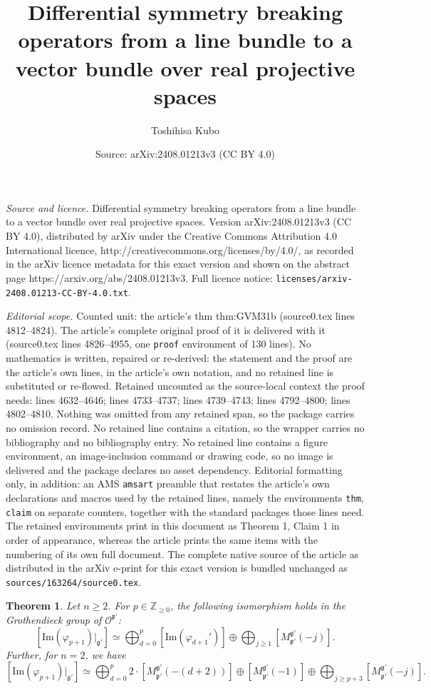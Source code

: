 \documentclass[10pt,a4paper]{amsart}
\title{Differential symmetry breaking operators from a line bundle to a vector bundle over real projective spaces}
\author{Toshihisa Kubo}
\date{Source: arXiv:2408.01213v3 (CC BY 4.0)}
\newtheorem{thm}{Theorem}
\newcommand{\Cal}{\mathcal}
\renewcommand{\Im}{\mathrm{Im}}
\newcommand{\Mpp}{M^{\fg'}_{\fp'}}
\newcommand{\Z}{\mathbb{Z}}
\newcommand{\fg}{{\mathfrak g}}
\newcommand{\fp}{{\mathfrak p}}
\begin{document}
\maketitle

\noindent\emph{Source and licence.} Differential symmetry breaking operators from a line bundle to a vector bundle over real projective spaces. Version arXiv:2408.01213v3 (CC BY 4.0), distributed by arXiv under the Creative Commons Attribution 4.0 International licence, http://creativecommons.org/licenses/by/4.0/, as recorded in the arXiv licence metadata for this exact version and shown on the abstract page https://arxiv.org/abs/2408.01213v3. Full licence notice: \texttt{licenses/arxiv-2408.01213-CC-BY-4.0.txt}.\par\smallskip

\noindent\textit{Editorial scope.} Counted unit: the article's thm thm:GVM31b (source0.tex lines 4812--4824). The article's complete original proof of it is delivered with it (source0.tex lines 4826--4955, one \texttt{proof} environment of 130 lines). No mathematics is written, repaired or re-derived: the statement and the proof are the article's own lines, in the article's own notation, and no retained line is substituted or re-flowed.  Retained uncounted as the source-local context the proof needs: lines 4632--4646; lines 4733--4737; lines 4739--4743; lines 4792--4800; lines 4802--4810.  Nothing was omitted from any retained span, so the package carries no omission record.  No retained line contains a citation, so the wrapper carries no bibliography and no bibliography entry.  No retained line contains a figure environment, an image-inclusion command or drawing code, so no image is delivered and the package declares no asset dependency.  Editorial formatting only, in addition: an AMS \texttt{amsart} preamble that restates the article's own declarations and macros used by the retained lines, namely the environments \texttt{thm}, \texttt{claim} on separate counters, together with the standard packages those lines need.  The retained environments print in this document as Theorem 1, Claim 1 in order of appearance, whereas the article prints the same items with the numbering of its own full document.  The complete native source of the article as distributed in the arXiv e-print for this exact version is bundled unchanged as \texttt{sources/163264/source0.tex}.
\begin{thm}\label{thm:GVM2}
Let $n\geq 2$. For $p \in \Z_{\geq 0}$, 
the following isomorphism holds
in the Grothendieck group of $\Cal{O}^{\fp'}$:
\begin{equation}\label{eqn:GVM3a}
[\Im(\varphi_{p+1})\vert_{\fg'}] \simeq 
\bigoplus_{d=0}^p [\Im (\varphi_{d+1}')] \oplus \bigoplus_{j \geq 1} [\Mpp(-j)].
\end{equation}
Further, for $n=2$, we have 
\begin{equation}\label{eqn:GVM3b}
[\Im(\varphi_{p+1})\vert_{\fg'}] \simeq 
\bigoplus_{d=0}^p 2 \cdot [\Mpp(-(d+2))] \oplus [\Mpp(-1)] \oplus 
\bigoplus_{j\geq p+3} [\Mpp(-j)].
\end{equation}
\end{thm}
\end{document}
